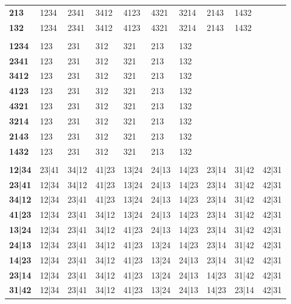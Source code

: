 \documentclass[letterpaper]{article}
\begin{document}
\begin{minipage}[t]{0.48\linewidth}
\begin{tabular}{@{}llllllllll@{}}
\rowcolor{altrow}
\textbf{213} & 1234 & 2341 & 3412 & 4123 & 4321 & 3214 & 2143 & 1432 &  \\
\textbf{132} & 1234 & 2341 & 3412 & 4123 & 4321 & 3214 & 2143 & 1432 &  \\
\rowcolor{headerbg}\multicolumn{10}{l}{\color{white}\textbf{4-fng seq / 3-fng seq}}\\
\rowcolor{altrow}
\textbf{1234} & 123 & 231 & 312 & 321 & 213 & 132 &  &  &  \\
\textbf{2341} & 123 & 231 & 312 & 321 & 213 & 132 &  &  &  \\
\rowcolor{altrow}
\textbf{3412} & 123 & 231 & 312 & 321 & 213 & 132 &  &  &  \\
\textbf{4123} & 123 & 231 & 312 & 321 & 213 & 132 &  &  &  \\
\rowcolor{altrow}
\textbf{4321} & 123 & 231 & 312 & 321 & 213 & 132 &  &  &  \\
\textbf{3214} & 123 & 231 & 312 & 321 & 213 & 132 &  &  &  \\
\rowcolor{altrow}
\textbf{2143} & 123 & 231 & 312 & 321 & 213 & 132 &  &  &  \\
\textbf{1432} & 123 & 231 & 312 & 321 & 213 & 132 &  &  &  \\
\rowcolor{headerbg}\multicolumn{10}{l}{\color{white}\textbf{4-finger pairs}}\\
\rowcolor{altrow}
\textbf{12|34} & 23|41 & 34|12 & 41|23 & 13|24 & 24|13 & 14|23 & 23|14 & 31|42 & 42|31 \\
\textbf{23|41} & 12|34 & 34|12 & 41|23 & 13|24 & 24|13 & 14|23 & 23|14 & 31|42 & 42|31 \\
\rowcolor{altrow}
\textbf{34|12} & 12|34 & 23|41 & 41|23 & 13|24 & 24|13 & 14|23 & 23|14 & 31|42 & 42|31 \\
\textbf{41|23} & 12|34 & 23|41 & 34|12 & 13|24 & 24|13 & 14|23 & 23|14 & 31|42 & 42|31 \\
\rowcolor{altrow}
\textbf{13|24} & 12|34 & 23|41 & 34|12 & 41|23 & 24|13 & 14|23 & 23|14 & 31|42 & 42|31 \\
\textbf{24|13} & 12|34 & 23|41 & 34|12 & 41|23 & 13|24 & 14|23 & 23|14 & 31|42 & 42|31 \\
\rowcolor{altrow}
\textbf{14|23} & 12|34 & 23|41 & 34|12 & 41|23 & 13|24 & 24|13 & 23|14 & 31|42 & 42|31 \\
\textbf{23|14} & 12|34 & 23|41 & 34|12 & 41|23 & 13|24 & 24|13 & 14|23 & 31|42 & 42|31 \\
\rowcolor{altrow}
\textbf{31|42} & 12|34 & 23|41 & 34|12 & 41|23 & 13|24 & 24|13 & 14|23 & 23|14 & 42|31 \\

\end{tabular}
\end{minipage}
\end{document}
